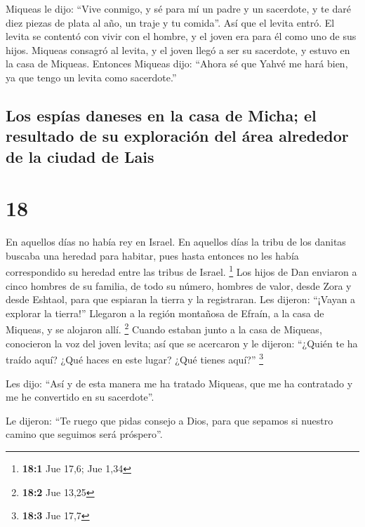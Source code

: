  Miqueas le dijo: ``Vive conmigo, y sé para mí un padre y
un sacerdote, y te daré diez piezas de plata al año, un traje y tu
comida''. Así que el levita entró.  El levita se contentó
con vivir con el hombre, y el joven era para él como uno de sus hijos.
 Miqueas consagró al levita, y el joven llegó a ser su
sacerdote, y estuvo en la casa de Miqueas.  Entonces
Miqueas dijo: ``Ahora sé que Yahvé me hará bien, ya que tengo un levita
como sacerdote.''

\hypertarget{los-espuxedas-daneses-en-la-casa-de-micha-el-resultado-de-su-exploraciuxf3n-del-uxe1rea-alrededor-de-la-ciudad-de-lais}{%
\subsection{Los espías daneses en la casa de Micha; el resultado de su
exploración del área alrededor de la ciudad de
Lais}\label{los-espuxedas-daneses-en-la-casa-de-micha-el-resultado-de-su-exploraciuxf3n-del-uxe1rea-alrededor-de-la-ciudad-de-lais}}

\hypertarget{section-17}{%
\section{18}\label{section-17}}

 En aquellos días no había rey en Israel. En aquellos días
la tribu de los danitas buscaba una heredad para habitar, pues hasta
entonces no les había correspondido su heredad entre las tribus de
Israel. \footnote{\textbf{18:1} Jue 17,6; Jue 1,34}  Los
hijos de Dan enviaron a cinco hombres de su familia, de todo su número,
hombres de valor, desde Zora y desde Eshtaol, para que espiaran la
tierra y la registraran. Les dijeron: ``¡Vayan a explorar la tierra!''
Llegaron a la región montañosa de Efraín, a la casa de Miqueas, y se
alojaron allí. \footnote{\textbf{18:2} Jue 13,25}  Cuando
estaban junto a la casa de Miqueas, conocieron la voz del joven levita;
así que se acercaron y le dijeron: ``¿Quién te ha traído aquí? ¿Qué
haces en este lugar? ¿Qué tienes aquí?'' \footnote{\textbf{18:3} Jue
  17,7}

 Les dijo: ``Así y de esta manera me ha tratado Miqueas,
que me ha contratado y me he convertido en su sacerdote''.

 Le dijeron: ``Te ruego que pidas consejo a Dios, para que
sepamos si nuestro camino que seguimos será próspero''.


